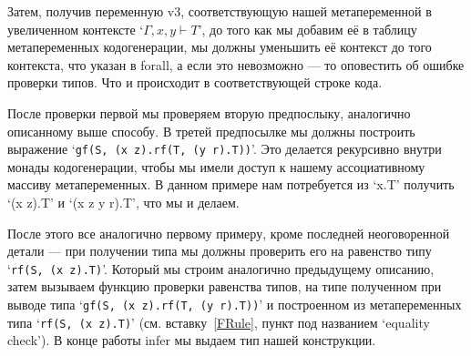 Затем, получив переменную v3, соответствующую нашей метапеременной в увеличенном контексте `$\Gamma, x, y \vdash T$', до того как мы добавим её в таблицу метапеременных кодогенерации, мы должны уменьшить её контекст до того контекста, что указан в forall, а если это невозможно --- то оповестить об ошибке проверки типов. Что и происходит в соответствующей строке кода.

После проверки первой мы проверяем вторую предпослыку, аналогично описанному выше способу. В третей предпосылке мы должны построить выражение `\lstinline{gf(S, (x z).rf(T, (y r).T))}'. Это делается рекурсивно внутри монады кодогенерации, чтобы мы имели доступ к нашему ассоциативному массиву метапеременных. В данном примере нам потребуется из `x.T' получить `(x z).T' и `(x z y r).T', что мы и делаем.

После этого все аналогично первому примеру, кроме последней неоговоренной детали --- при получении типа мы должны проверить его на равенство типу  `\lstinline{rf(S, (x z).T)}'. Который мы строим аналогично предыдущему описанию, затем вызываем функцию проверки равенства типов, на типе полученном при выводе типа `\lstinline{gf(S, (x z).rf(T, (y r).T))}' и построенном из метапеременных типа `\lstinline{rf(S, (x z).T)}' (см. вставку~\ref{FRule}, пункт под названием `equality check'). В конце работы infer мы выдаем тип нашей конструкции.

